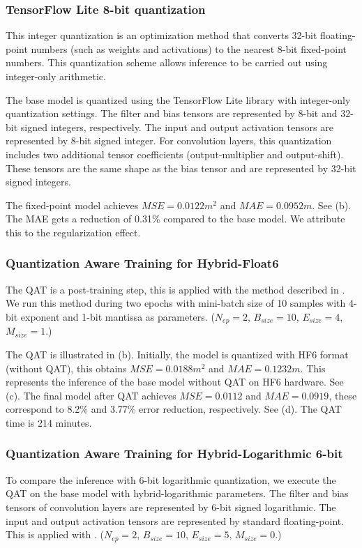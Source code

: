 \subsubsection{TensorFlow Lite 8-bit quantization}
This integer quantization is an optimization method that converts 32-bit floating-point numbers (such as weights and activations) to the nearest 8-bit fixed-point numbers. This quantization scheme allows inference to be carried out using integer-only arithmetic\cite{hannwindowsine}.

The base model is quantized using the TensorFlow Lite library with integer-only quantization settings. The filter and bias tensors are represented by 8-bit and 32-bit signed integers, respectively. The input and output activation tensors are represented by 8-bit signed integer. For convolution layers, this quantization includes two additional tensor coefficients (output-multiplier and output-shift). These tensors are the same shape as the bias tensor and are represented by 32-bit signed integers.

The fixed-point model achieves $MSE=0.0122 m^2$ and $MAE=0.0952m$. See (b). The MAE gets a reduction of 0.31\% compared to the base model. We attribute this to the regularization effect.

\subsubsection{Quantization Aware Training for Hybrid-Float6}
The QAT is a post-training step, this is applied with the method described in . We run this method during two epochs with mini-batch size of 10 samples with 4-bit exponent and 1-bit mantissa as parameters. ($N_{ep}=2$, $B_{size}=10$, $E_{size}=4$, $M_{size}=1$.)

The QAT is illustrated in (b). Initially, the model is quantized with HF6 format (without QAT), this obtains $MSE=0.0188m^2$ and $MAE=0.1232m$. This represents the inference of the base model without QAT on HF6 hardware. See (c). The final model after QAT achieves $MSE=0.0112$ and $MAE=0.0919$, these correspond to 8.2\% and 3.77\% error reduction, respectively. See (d). The QAT time is 214 minutes.

\subsubsection{Quantization Aware Training for Hybrid-Logarithmic 6-bit}
To compare the inference with 6-bit logarithmic quantization, we execute the QAT on the base model with hybrid-logarithmic parameters. The filter and bias tensors of convolution layers are represented by 6-bit signed logarithmic. The input and output activation tensors are represented by standard floating-point. This is applied with . ($N_{ep}=2$, $B_{size}=10$, $E_{size}=5$, $M_{size}=0$.)

